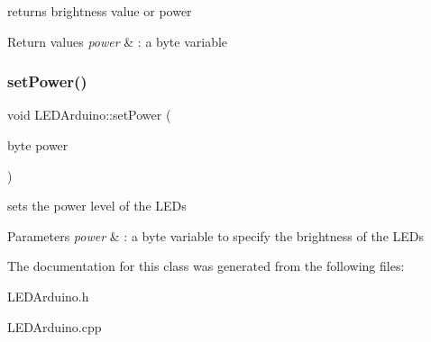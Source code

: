 returns brightness value or power 


\begin{DoxyRetVals}{Return values}
{\em power} & \+: a byte variable \\
\hline
\end{DoxyRetVals}
\mbox{\label{class_l_e_d_arduino_a1972cc7d80383adc42e910ecb13ffbb2}} 
\subsubsection{\texorpdfstring{set\+Power()}{setPower()}}
{\footnotesize\ttfamily void L\+E\+D\+Arduino\+::set\+Power (\begin{DoxyParamCaption}\item[{byte}]{power }\end{DoxyParamCaption})}



sets the power level of the L\+E\+Ds 


\begin{DoxyParams}{Parameters}
{\em power} & \+: a byte variable to specify the brightness of the L\+E\+Ds \\
\hline
\end{DoxyParams}


The documentation for this class was generated from the following files\+:\begin{DoxyCompactItemize}
\item 
L\+E\+D\+Arduino.\+h\item 
L\+E\+D\+Arduino.\+cpp\end{DoxyCompactItemize}
